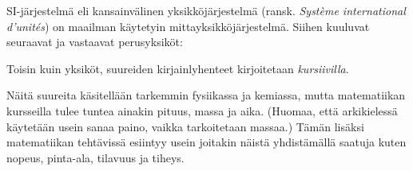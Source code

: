 SI-järjestelmä eli kansainvälinen yksikköjärjestelmä (ransk. \textit{Système international d'unités}) on maailman käytetyin mittayksikköjärjestelmä. Siihen kuuluvat seuraavat  ja vastaavat perusyksiköt:


Toisin kuin yksiköt, suureiden kirjainlyhenteet kirjoitetaan \textit{kursiivilla}. %

Näitä suureita käsitellään tarkemmin fysiikassa ja kemiassa, mutta matematiikan kursseilla tulee tuntea ainakin pituus, massa ja aika. (Huomaa, että arkikielessä käytetään usein sanaa paino, vaikka tarkoitetaan massaa.) Tämän lisäksi matematiikan tehtävissä esiintyy usein joitakin näistä yhdistämällä saatuja  kuten nopeus, pinta-ala, tilavuus ja tiheys.

